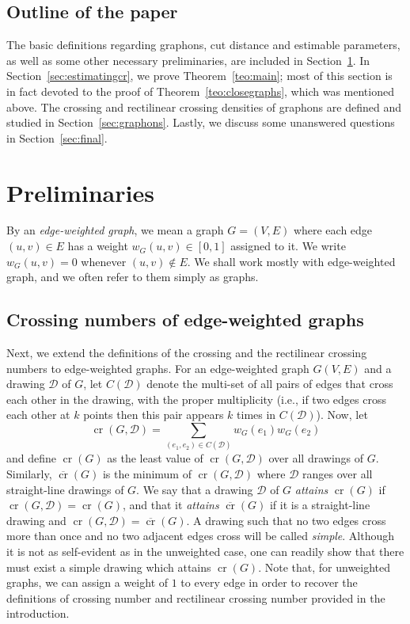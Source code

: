 \documentclass{article}
\begin{document}
\subsection*{Outline of the paper} The basic definitions regarding graphons, cut distance and estimable parameters, as well as some other necessary preliminaries, are included in Section~\ref{sec:prelim}. In Section~\ref{sec:estimatingcr}, we prove Theorem~\ref{teo:main}; most of this section is in fact devoted to the proof of Theorem~\ref{teo:closegraphs}, which was mentioned above. The crossing and rectilinear crossing densities of graphons are defined and studied in Section~\ref{sec:graphons}. Lastly, we discuss some unanswered questions in Section~\ref{sec:final}.

\section{Preliminaries}\label{sec:prelim}

By an \textit{edge-weighted graph}, we mean a graph $G=(V,E)$ where each edge $(u,v)\in E$ has a weight $w_G(u,v)\in[0,1]$ assigned to it. We write $w_G(u,v)=0$ whenever $(u,v)\notin E$. We shall work mostly with edge-weighted graph, and we often refer to them simply as graphs.

\subsection{Crossing numbers of edge-weighted graphs}\label{sec:weightedcrossingnumber}


Next, we extend the definitions of the crossing and the rectilinear crossing numbers to edge-weighted graphs. For an edge-weighted graph $G(V,E)$ and a drawing $\mathcal{D}$ of $G$, let $C(\mathcal{D})$ denote the multi-set of all pairs of edges that cross each other in the drawing, with the proper multiplicity (i.e., if two edges cross each other at $k$ points then this pair appears $k$ times in $C(\mathcal{D})$). Now, let \[\mathop{\mathrm{cr}}(G,\mathcal{D})=\sum_{(e_1,e_2)\in C(\mathcal{D})}w_G(e_1)w_G(e_2)\] and define $\mathop{\mathrm{cr}}(G)$ as the least value of $\mathop{\mathrm{cr}}(G,\mathcal{D})$ over all drawings of $G$. Similarly, $\overline{\mathop{\mathrm{cr}}}(G)$ is the minimum of $\mathop{\mathrm{cr}}(G,\mathcal{D})$ where $\mathcal{D}$ ranges over all straight-line drawings of $G$. We say that a drawing $\mathcal{D}$ of $G$ \textit{attains} $\mathop{\mathrm{cr}}(G)$ if $\mathop{\mathrm{cr}}(G,\mathcal{D})=\mathop{\mathrm{cr}}(G)$, and that it \textit{attains} $\overline{\mathop{\mathrm{cr}}}(G)$ if it is a straight-line drawing and $\mathop{\mathrm{cr}}(G,\mathcal{D})=\overline{\mathop{\mathrm{cr}}}(G)$. A drawing such that no two edges cross more than once and no two adjacent edges cross will be called \textit{simple}. Although it is not as self-evident as in the unweighted case, one can readily show that there must exist a simple drawing which attains $\mathop{\mathrm{cr}}(G)$. Note that, for unweighted graphs, we can assign a weight of $1$ to every edge in order to recover the definitions of crossing number and rectilinear crossing number provided in the introduction.
\end{document}
